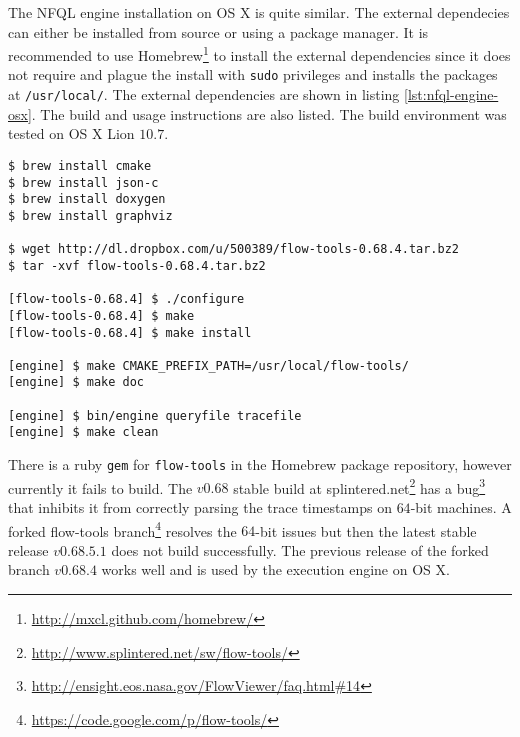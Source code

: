 The \ac{NFQL} engine installation on OS X is quite similar. The external
dependecies can either be installed from source or using a package manager.
It is recommended to use
Homebrew\footnote{\url{http://mxcl.github.com/homebrew/}} to install the
external dependencies  since it does not require
and plague the install with \texttt{sudo} privileges and installs the packages
at \texttt{/usr/local/}. The external dependencies are shown in listing
\ref{lst:nfql-engine-osx}. The build and usage instructions are also listed.
The build environment was tested on OS X Lion $10.7$.

\begin{lstlisting}
$ brew install cmake
$ brew install json-c
$ brew install doxygen
$ brew install graphviz

$ wget http://dl.dropbox.com/u/500389/flow-tools-0.68.4.tar.bz2
$ tar -xvf flow-tools-0.68.4.tar.bz2

[flow-tools-0.68.4] $ ./configure
[flow-tools-0.68.4] $ make
[flow-tools-0.68.4] $ make install

[engine] $ make CMAKE_PREFIX_PATH=/usr/local/flow-tools/
[engine] $ make doc

[engine] $ bin/engine queryfile tracefile
[engine] $ make clean
\end{lstlisting}

There is a ruby \texttt{gem} for \texttt{flow-tools} in the Homebrew package
repository, however currently it fails to build. The $v0.68$ stable build at
splintered.net\footnote{\url{http://www.splintered.net/sw/flow-tools/}} has a
bug\footnote{\url{http://ensight.eos.nasa.gov/FlowViewer/faq.html#14}} that
inhibits it from correctly parsing the trace timestamps  on $64$-bit machines. A forked flow-tools
branch\footnote{\url{https://code.google.com/p/flow-tools/}} resolves the
$64$-bit issues but then the latest stable release $v0.68.5.1$ does not build
successfully. The previous release of the forked branch $v0.68.4$ works well
and is used by the execution engine on OS X.
